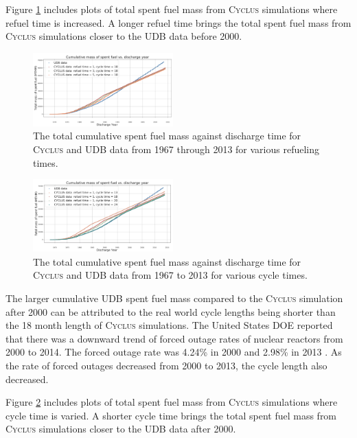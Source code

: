 \documentclass{anstrans}
\newcommand{\Cyclus}{\textsc{Cyclus}\xspace}%
\begin{document}
Figure \ref{fig:total_refueltime} includes plots of total spent fuel mass from \Cyclus simulations where refuel time is increased. A longer refuel time brings the total spent fuel mass from \Cyclus simulations closer to the UDB data before 2000. 

\begin{figure}[t] 
	\centering
	\includegraphics[width=0.48\textwidth]{figures/total_cumulative_mass_spent_fuel_refueltime}
	\caption{The total cumulative spent fuel mass against discharge time for \Cyclus and UDB data from 1967 through 2013 for various refueling times.}
	\label{fig:total_refueltime}
\end{figure} 

\begin{figure}[b] %
	\centering
	\includegraphics[width=0.48\textwidth]{figures/total_cumulative_mass_spent_fuel_cycletime}
	\caption{The total cumulative spent fuel mass against discharge time for \Cyclus and UDB data from 1967 to 2013 for various cycle times.}
	\label{fig:total_cycletime}
\end{figure} 

The larger cumulative UDB spent fuel mass compared to the \Cyclus simulation after 2000 can be attributed to the real world cycle lengths being shorter than the 18 month length of \Cyclus simulations. The United States DOE reported that there was a downward trend of forced outage rates of nuclear reactors from 2000 to 2014. The forced outage rate was 4.24\% in 2000 and 2.98\% in 2013 \cite{gehin_nuclear_2016}. As the rate of forced outages decreased from 2000 to 2013, the cycle length also decreased. 

Figure \ref{fig:total_cycletime} includes plots of total spent fuel mass from \Cyclus simulations where cycle time is varied. A shorter cycle time brings the total spent fuel mass from \Cyclus simulations closer to the UDB data after 2000. 
\end{document}
